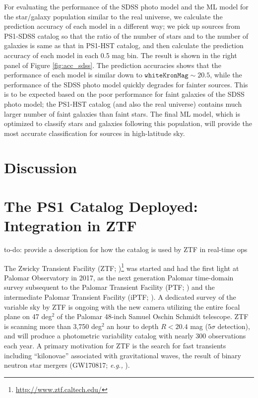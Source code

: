 \documentclass[twocolumn]{aastex62}
\newcommand{\todo}[1]{{\color{magenta} to-do: {#1}}}
\begin{document}
{For evaluating the performance of the SDSS photo model and the ML model 
for the star/galaxy population similar to the real universe, 
we calculate the prediction accuracy of each model in a different way; 
we pick up sources from PS1-SDSS catalog 
so that the ratio of the number of stars and to the number of galaxies 
is same as that in PS1-HST catalog, and then calculate the prediction accuracy of each model in each 0.5 mag bin. 
The result is shown in the right panel of Figure \ref{fig:acc_sdss}. 
The prediction accuracies shows that the performance of each model is similar 
down to $\mathtt{whiteKronMag} \sim20.5$, 
while the performance of the SDSS photo model quickly degrades for fainter sources. 
This is to be expected based on the poor performance for faint galaxies of the SDSS photo model; 
the PS1-HST catalog (and also the real universe) contains much larger number of faint galaxies than faint stars. 
The final ML model, which is optimized to classify stars and galaxies following this population, 
will provide the most accurate classification for sources in high-latitude sky. 
} 
\section{Discussion}

\section{The PS1 Catalog Deployed: Integration in ZTF}

\todo{provide a description for how the catalog is used by ZTF in real-time ops}

The Zwicky Transient Facility (ZTF; 
\citealt{Kulkarni12, Bellm14, Smith14, Dekany16, Bellm17})\footnote{\url{http://www.ztf.caltech.edu/}} 
was started and had the first light at Palomar Observatory in 2017, 
as the next generation Palomar time-domain survey 
subsequent to the Palomar Transient Facility (PTF; \citealt{Rau09, Law09}) 
and the intermediate Palomar Transient Facility (iPTF; \citealt{Kulkarni13}). 
A dedicated survey of the variable sky by ZTF is ongoing with the new camera 
utilizing the entire focal plane on 47 deg$^2$ of the Palomar 48-inch Samuel Oschin Schmidt telescope. 
ZTF is scanning more than 3,750 deg$^2$ an hour to depth $R < 20.4$ mag ($5\sigma$ detection), 
and will produce a photometric variability catalog with nearly 300 observations each year. 
A primary motivation for ZTF is the search for fast transients 
including ``kilonovae'' 
associated with gravitational waves, 
the result of binary neutron star mergers 
(GW170817; {\it e.g.,} \citealt{Abbott17, Cowperthwaite17, Lipunov17, Kasliwal17, Utsumi17, Tanaka17}). 
\end{document}
